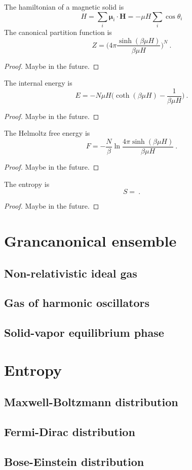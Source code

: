     The hamiltonian of a magnetic solid is 
    \begin{equation*}
        H = \sum_i \boldsymbol \mu_i \cdot \mathbf H = - \mu H \sum_i \cos \theta_i
    \end{equation*}
    The canonical partition function is 
    \begin{equation*}
        Z = \Big ( 4 \pi \frac{\sinh (\beta \mu H)}{\beta \mu H} \Big)^N ~.
    \end{equation*}
    \begin{proof}
        Maybe in the future.
    \end{proof}
    
    The internal energy is 
    \begin{equation*}
        E = - N \mu H \Big ( \coth (\beta \mu H) - \frac{1}{\beta \mu H} \Big) ~.
    \end{equation*}
    \begin{proof}
        Maybe in the future.
    \end{proof}
    
    The Helmoltz free energy is 
    \begin{equation*}
        F = - \frac{N}{\beta} \ln \frac{4 \pi \sinh (\beta \mu H)}{\beta \mu H} ~.
    \end{equation*}
    \begin{proof}
        Maybe in the future.
    \end{proof}
    
    The entropy is 
    \begin{equation*}
        S =  ~.
    \end{equation*}
    \begin{proof}
        Maybe in the future.
    \end{proof}
    
\chapter{Grancanonical ensemble}
\section{Non-relativistic ideal gas}
\section{Gas of harmonic oscillators}
\section{Solid-vapor equilibrium phase}

\chapter{Entropy}
\section{Maxwell-Boltzmann distribution}
\section{Fermi-Dirac distribution}
\section{Bose-Einstein distribution}

    